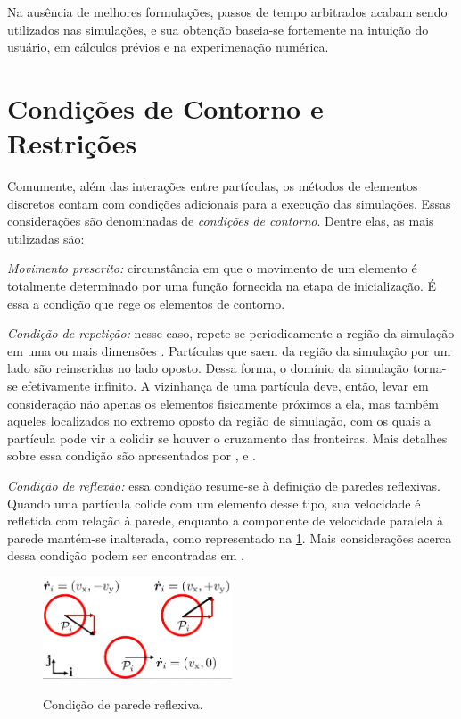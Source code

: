Na ausência de melhores formulações, passos de tempo arbitrados acabam sendo utilizados nas simulações, e sua obtenção baseia-se fortemente na intuição do usuário, em cálculos prévios e na experimenação numérica.

\section{Condições de Contorno e Restrições} \label{sec:boundary_condition}

Comumente, além das interações entre partículas, os métodos de elementos discretos contam com condições adicionais para a execução das simulações. Essas considerações são denominadas de \textit{condições de contorno}. Dentre elas, as mais utilizadas são:
\begin{alineas}
\item \textit{Movimento prescrito:} circunstância em que o movimento de um elemento é totalmente determinado por uma função fornecida na etapa de inicialização. É essa a condição que rege os elementos de contorno.
\item \textit{Condição de repetição:} nesse caso, repete-se periodicamente a região da simulação em uma ou mais dimensões \cite[p. 15]{bib:computational_granular_dynamics}. Partículas que saem da região da simulação por um lado são reinseridas no lado oposto. Dessa forma, o domínio da simulação torna-se efetivamente infinito. A vizinhança de uma partícula deve, então, levar em consideração não apenas os elementos fisicamente próximos a ela, mas também aqueles localizados no extremo oposto da região de simulação, com os quais a partícula pode vir a colidir se houver o cruzamento das fronteiras. Mais detalhes sobre essa condição são apresentados por ,  e .
\item \textit{Condição de reflexão:} essa condição resume-se à definição de paredes reflexivas. Quando uma partícula colide com um elemento desse tipo, sua velocidade é refletida com relação à parede, enquanto a componente de velocidade paralela à parede mantém-se inalterada, como representado na \cref{fig:boundary_conditions:reflecting_boundary}. Mais considerações acerca dessa condição podem ser encontradas em .

\begin{figure}[h]
	\caption{Condição de parede reflexiva.}
	\centering
		\includegraphics[width=0.5\textwidth]{images/discrete_element_method/boundary_conditions/reflecting_boundary.pdf}
	\label{fig:boundary_conditions:reflecting_boundary}
	\sourceMe
\end{figure}


\end{alineas}
